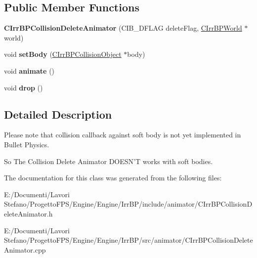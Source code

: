 \subsection*{Public Member Functions}
\begin{DoxyCompactItemize}
\item 
\hypertarget{class_c_irr_b_p_collision_delete_animator_a4f097a814c55b2680acaa341e55aacc5}{
{\bfseries CIrrBPCollisionDeleteAnimator} (CIB\_\-DFLAG deleteFlag, \hyperlink{class_c_irr_b_p_world}{CIrrBPWorld} $\ast$world)}
\label{class_c_irr_b_p_collision_delete_animator_a4f097a814c55b2680acaa341e55aacc5}

\item 
\hypertarget{class_c_irr_b_p_collision_delete_animator_af69d93e6d128c6526ab8213ea69a63ab}{
void {\bfseries setBody} (\hyperlink{class_c_irr_b_p_collision_object}{CIrrBPCollisionObject} $\ast$body)}
\label{class_c_irr_b_p_collision_delete_animator_af69d93e6d128c6526ab8213ea69a63ab}

\item 
\hypertarget{class_c_irr_b_p_collision_delete_animator_a45e5e67fe3f214bcd0b12a29c657a2bf}{
void {\bfseries animate} ()}
\label{class_c_irr_b_p_collision_delete_animator_a45e5e67fe3f214bcd0b12a29c657a2bf}

\item 
\hypertarget{class_c_irr_b_p_collision_delete_animator_acbdbc88edb38bf253dcae6588574d95c}{
void {\bfseries drop} ()}
\label{class_c_irr_b_p_collision_delete_animator_acbdbc88edb38bf253dcae6588574d95c}

\end{DoxyCompactItemize}


\subsection{Detailed Description}
Please note that collision callback against soft body is not yet implemented in Bullet Physics.\par
 So The Collision Delete Animator DOESN'T works with soft bodies. 

The documentation for this class was generated from the following files:\begin{DoxyCompactItemize}
\item 
E:/Documenti/Lavori Stefano/ProgettoFPS/Engine/Engine/IrrBP/include/animator/CIrrBPCollisionDeleteAnimator.h\item 
E:/Documenti/Lavori Stefano/ProgettoFPS/Engine/Engine/IrrBP/src/animator/CIrrBPCollisionDeleteAnimator.cpp\end{DoxyCompactItemize}
